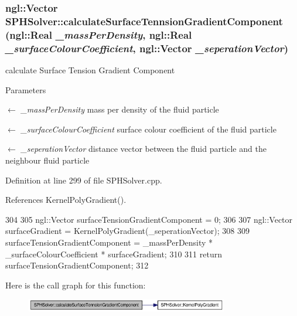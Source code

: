 \hypertarget{class_s_p_h_solver_a5ff4d84f41872763f04dfac24bda7e5d}{
\subsubsection[{calculateSurfaceTennsionGradientComponent}]{\setlength{\rightskip}{0pt plus 5cm}ngl::Vector SPHSolver::calculateSurfaceTennsionGradientComponent (ngl::Real {\em \_\-massPerDensity}, \/  ngl::Real {\em \_\-surfaceColourCoefficient}, \/  ngl::Vector {\em \_\-seperationVector})}}
\label{class_s_p_h_solver_a5ff4d84f41872763f04dfac24bda7e5d}


calculate Surface Tension Gradient Component 


\begin{DoxyParams}{Parameters}
\item[\mbox{$\leftarrow$} {\em \_\-massPerDensity}]mass per density of the fluid particle \item[\mbox{$\leftarrow$} {\em \_\-surfaceColourCoefficient}]surface colour coefficient of the fluid particle \item[\mbox{$\leftarrow$} {\em \_\-seperationVector}]distance vector between the fluid particle and the neighbour fluid particle \end{DoxyParams}


Definition at line 299 of file SPHSolver.cpp.



References KernelPolyGradient().




\begin{DoxyCode}
304 {
305     ngl::Vector surfaceTensionGradientComponent = 0;
306 
307     ngl::Vector surfaceGradient =  KernelPolyGradient(_seperationVector);
308 
309     surfaceTensionGradientComponent = _massPerDensity * _surfaceColourCoefficient
       * surfaceGradient;
310 
311     return surfaceTensionGradientComponent;
312 }
\end{DoxyCode}




Here is the call graph for this function:\nopagebreak
\begin{figure}[H]
\begin{center}
\leavevmode
\includegraphics[width=250pt]{class_s_p_h_solver_a5ff4d84f41872763f04dfac24bda7e5d_cgraph}
\end{center}
\end{figure}


